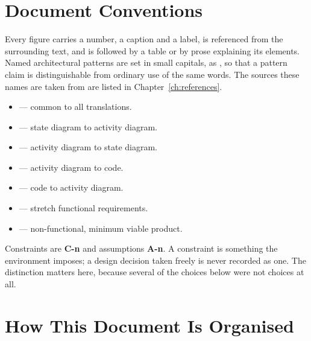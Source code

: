 \section{Document Conventions}

Every figure carries a number, a caption and a label, is referenced from the
surrounding text, and is followed by a table or by prose explaining its
elements. Named architectural patterns are set in small capitals, as
, so that a pattern claim is distinguishable from
ordinary use of the same words. The sources these names are taken from are
listed in Chapter~\ref{ch:references}.

\begin{itemize}[nosep]
	\item {} --- common to all translations.
	\item {} --- state diagram to activity diagram.
	\item {} --- activity diagram to state diagram.
	\item {} --- activity diagram to code.
	\item {} --- code to activity diagram.
	\item {} --- stretch functional requirements.
	\item {} --- non-functional, minimum viable product.
\end{itemize}

Constraints are \textbf{C-n} and assumptions \textbf{A-n}. A constraint is
something the environment imposes; a design decision taken freely is never
recorded as one. The distinction matters here, because several of the choices
below were not choices at all.

\section{How This Document Is Organised}

